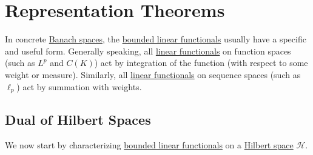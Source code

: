 \section{Representation Theorems}
In concrete \hyperref[def:Banach-space]{Banach spaces}, the \hyperref[def:bounded-linear-functional]{bounded linear functionals} usually have a specific and useful form. Generally speaking, all \hyperref[def:linear-functional]{linear functionals} on function spaces (such as \(L^p\) and \(C(K)\)) act by integration of the function (with respect to some weight or measure). Similarly, all \hyperref[def:linear-functional]{linear functionals} on sequence spaces (such as \(\ell _p\)) act by summation with weights.

\subsection{Dual of Hilbert Spaces}
We now start by characterizing \hyperref[def:bounded-linear-functional]{bounded linear functionals} on a \hyperref[def:Hilbert-space]{Hilbert space} \(\mathcal{H} \).

